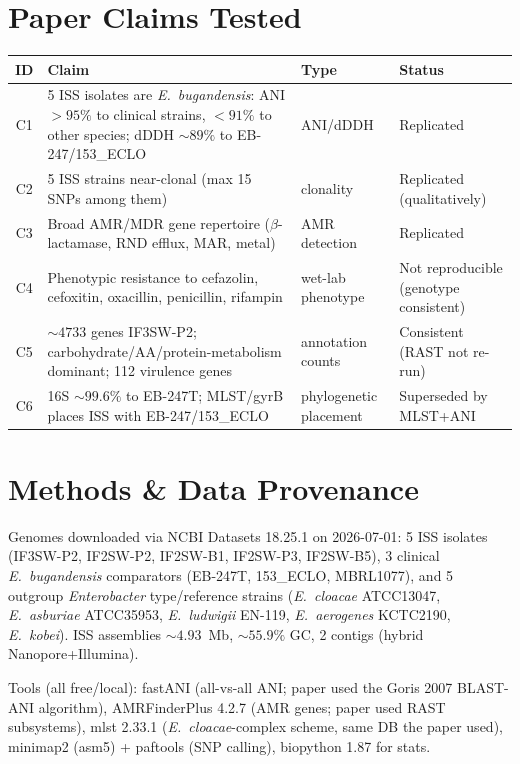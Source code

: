 \documentclass[11pt]{article}
\begin{document}
\section{Paper Claims Tested}
\begin{longtable}{@{}c p{9.5cm} l l@{}}
\toprule
ID & Claim & Type & Status \\ \midrule
C1 & 5 ISS isolates are \textit{E.~bugandensis}: ANI ${>}95\%$ to clinical strains, ${<}91\%$ to other species; dDDH ${\sim}89\%$ to EB-247/153\_ECLO & ANI/dDDH & Replicated \\
C2 & 5 ISS strains near-clonal (max 15 SNPs among them) & clonality & Replicated (qualitatively) \\
C3 & Broad AMR/MDR gene repertoire ($\beta$-lactamase, RND efflux, MAR, metal) & AMR detection & Replicated \\
C4 & Phenotypic resistance to cefazolin, cefoxitin, oxacillin, penicillin, rifampin & wet-lab phenotype & Not reproducible (genotype consistent) \\
C5 & ${\sim}4733$ genes IF3SW-P2; carbohydrate/AA/protein-metabolism dominant; 112 virulence genes & annotation counts & Consistent (RAST not re-run) \\
C6 & 16S ${\sim}99.6\%$ to EB-247T; MLST/gyrB places ISS with EB-247/153\_ECLO & phylogenetic placement & Superseded by MLST+ANI \\
\bottomrule
\end{longtable}

\section{Methods \& Data Provenance}
Genomes downloaded via NCBI Datasets 18.25.1 on 2026-07-01: 5 ISS isolates (IF3SW-P2, IF2SW-P2,
IF2SW-B1, IF2SW-P3, IF2SW-B5), 3 clinical \textit{E.~bugandensis} comparators (EB-247T, 153\_ECLO, MBRL1077),
and 5 outgroup \textit{Enterobacter} type/reference strains (\textit{E.~cloacae} ATCC13047, \textit{E.~asburiae}
ATCC35953, \textit{E.~ludwigii} EN-119, \textit{E.~aerogenes} KCTC2190, \textit{E.~kobei}).
ISS assemblies ${\sim}4.93$~Mb, ${\sim}55.9\%$ GC, 2 contigs (hybrid Nanopore+Illumina).

Tools (all free/local): fastANI (all-vs-all ANI; paper used the Goris 2007 BLAST-ANI algorithm),
AMRFinderPlus 4.2.7 (AMR genes; paper used RAST subsystems), mlst 2.33.1 (\textit{E.~cloacae}-complex
scheme, same DB the paper used), minimap2 (asm5) + paftools (SNP calling), biopython 1.87 for stats.
\end{document}
